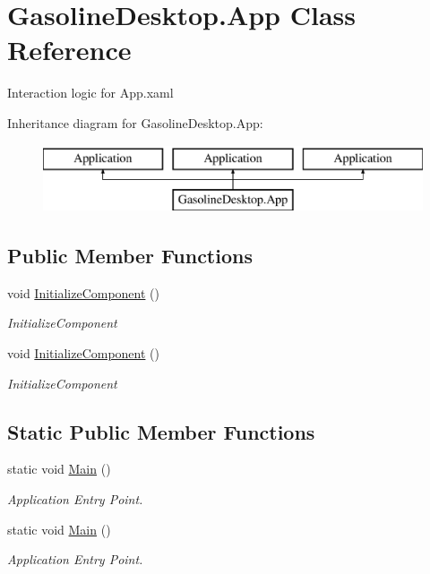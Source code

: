 \hypertarget{class_gasoline_desktop_1_1_app}{}\section{Gasoline\+Desktop.\+App Class Reference}
\label{class_gasoline_desktop_1_1_app}


Interaction logic for App.\+xaml  


Inheritance diagram for Gasoline\+Desktop.\+App\+:\begin{figure}[H]
\begin{center}
\leavevmode
\includegraphics[height=2.000000cm]{class_gasoline_desktop_1_1_app}
\end{center}
\end{figure}
\subsection*{Public Member Functions}
\begin{DoxyCompactItemize}
\item 
void \mbox{\hyperlink{class_gasoline_desktop_1_1_app_a5da1449612f8c2613f446c2e9ab36a7b}{Initialize\+Component}} ()
\begin{DoxyCompactList}\small\item\em Initialize\+Component \end{DoxyCompactList}\item 
void \mbox{\hyperlink{class_gasoline_desktop_1_1_app_a5da1449612f8c2613f446c2e9ab36a7b}{Initialize\+Component}} ()
\begin{DoxyCompactList}\small\item\em Initialize\+Component \end{DoxyCompactList}\end{DoxyCompactItemize}
\subsection*{Static Public Member Functions}
\begin{DoxyCompactItemize}
\item 
static void \mbox{\hyperlink{class_gasoline_desktop_1_1_app_a2597949a08b7df1c9f6bca2f959eaa27}{Main}} ()
\begin{DoxyCompactList}\small\item\em Application Entry Point. \end{DoxyCompactList}\item 
static void \mbox{\hyperlink{class_gasoline_desktop_1_1_app_a2597949a08b7df1c9f6bca2f959eaa27}{Main}} ()
\begin{DoxyCompactList}\small\item\em Application Entry Point. \end{DoxyCompactList}\end{DoxyCompactItemize}
